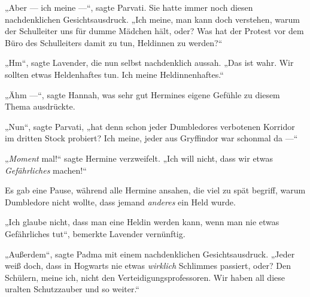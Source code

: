 „Aber — ich meine —“, sagte Parvati. Sie hatte immer noch diesen nachdenklichen Gesichtsausdruck.
„Ich meine, man kann doch verstehen, warum der Schulleiter uns für dumme Mädchen hält, oder? Was hat der Protest vor dem Büro des Schulleiters damit zu tun, Heldinnen zu werden?“

„Hm“, sagte Lavender, die nun selbst nachdenklich aussah.
„Das ist wahr. Wir sollten etwas Heldenhaftes tun. Ich meine Heldinnenhaftes.“

„Ähm —“, sagte Hannah, was sehr gut Hermines eigene Gefühle zu diesem Thema ausdrückte.

„Nun“, sagte Parvati, „hat denn schon jeder Dumbledores verbotenen Korridor im dritten Stock probiert? Ich meine, jeder aus Gryffindor war schonmal da —“

„\emph{Moment} mal!“ sagte Hermine verzweifelt.
„Ich will nicht, dass wir etwas \emph{Gefährliches} machen!“

Es gab eine Pause, während alle Hermine ansahen, die viel zu spät begriff, warum Dumbledore nicht wollte, dass jemand \emph{anderes} ein Held wurde.

„Ich glaube nicht, dass man eine Heldin werden kann, wenn man nie etwas Gefährliches tut“, bemerkte Lavender vernünftig.

„Außerdem“, sagte Padma mit einem nachdenklichen Gesichtsausdruck.
„Jeder weiß doch, dass in Hogwarts nie etwas \emph{wirklich} Schlimmes passiert, oder? Den Schülern, meine ich, nicht den Verteidigungsprofessoren. Wir haben all diese uralten Schutzzauber und so weiter.“


